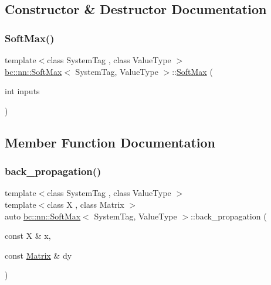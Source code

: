 \subsection{Constructor \& Destructor Documentation}
\mbox{\label{structbc_1_1nn_1_1SoftMax_adb6fc880a69498f69e276f25adc24666}} 
\subsubsection{\texorpdfstring{Soft\+Max()}{SoftMax()}}
{\footnotesize\ttfamily template$<$class System\+Tag , class Value\+Type $>$ \\
\hyperlink{structbc_1_1nn_1_1SoftMax}{bc\+::nn\+::\+Soft\+Max}$<$ System\+Tag, Value\+Type $>$\+::\hyperlink{structbc_1_1nn_1_1SoftMax}{Soft\+Max} (\begin{DoxyParamCaption}\item[{int}]{inputs }\end{DoxyParamCaption})\hspace{0.3cm}{\ttfamily [inline]}}



\subsection{Member Function Documentation}
\mbox{\label{structbc_1_1nn_1_1SoftMax_a61b74940e2e55753f7409cfd4af87c5c}} 
\subsubsection{\texorpdfstring{back\+\_\+propagation()}{back\_propagation()}}
{\footnotesize\ttfamily template$<$class System\+Tag , class Value\+Type $>$ \\
template$<$class X , class Matrix $>$ \\
auto \hyperlink{structbc_1_1nn_1_1SoftMax}{bc\+::nn\+::\+Soft\+Max}$<$ System\+Tag, Value\+Type $>$\+::back\+\_\+propagation (\begin{DoxyParamCaption}\item[{const X \&}]{x,  }\item[{const \hyperlink{namespacebc_a92dd1e243183b382432a5fac3ed8b89f}{Matrix} \&}]{dy }\end{DoxyParamCaption})\hspace{0.3cm}{\ttfamily [inline]}}


